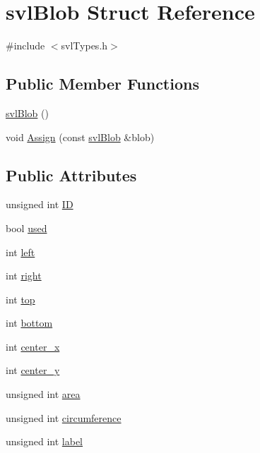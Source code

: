 \hypertarget{structsvl_blob}{}\section{svl\+Blob Struct Reference}
\label{structsvl_blob}


{\ttfamily \#include $<$svl\+Types.\+h$>$}

\subsection*{Public Member Functions}
\begin{DoxyCompactItemize}
\item 
\hyperlink{structsvl_blob_aa5c85bcf7e5f81957753d25529fb75cc}{svl\+Blob} ()
\item 
void \hyperlink{structsvl_blob_a0c568061d55f208e487d49d7c6c91a9a}{Assign} (const \hyperlink{structsvl_blob}{svl\+Blob} \&blob)
\end{DoxyCompactItemize}
\subsection*{Public Attributes}
\begin{DoxyCompactItemize}
\item 
unsigned int \hyperlink{structsvl_blob_a5174e92930ddfc63cbf0f76c304277ed}{I\+D}
\item 
bool \hyperlink{structsvl_blob_a08ce50cc736dfb4bdcd8a14c4e4831a5}{used}
\item 
int \hyperlink{structsvl_blob_a1abceb138580922b5858370101e0ee81}{left}
\item 
int \hyperlink{structsvl_blob_a49a7d67d8af30cb95f4ff0cef20d8dde}{right}
\item 
int \hyperlink{structsvl_blob_a6f36e9987b39314c8d8e77070f5c4ae8}{top}
\item 
int \hyperlink{structsvl_blob_a536219faa643cda03590b3582964cae8}{bottom}
\item 
int \hyperlink{structsvl_blob_a13f6815c8e9adc6a23344281388a6297}{center\+\_\+x}
\item 
int \hyperlink{structsvl_blob_a8f827cd578843e0d8456d9e95f982988}{center\+\_\+y}
\item 
unsigned int \hyperlink{structsvl_blob_a7e72d5f683c384f0980f6d322630af74}{area}
\item 
unsigned int \hyperlink{structsvl_blob_a880846887397dd387770e6244a680513}{circumference}
\item 
unsigned int \hyperlink{structsvl_blob_a8c07b58d3ca8fa083d94f705c1b518c0}{label}
\end{DoxyCompactItemize}


